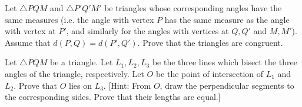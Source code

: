 \begin{tcolorbox}[title=Problem 11, breakable]
    Let $\triangle PQM$ and $\triangle P'Q'M'$ be triangles whose corresponding
        angles have the same measures (i.e. the angle with vertex $P$ has the same 
        measure as the angle with vertex at $P'$, and similarly for the angles with
        vertices at $Q, Q'$ and $M, M'$). Assume that $d(P, Q) = d(P', Q')$.
    Prove that the triangles are congruent.
\end{tcolorbox}

\begin{tcolorbox}[title=Problem 12, breakable]
    Let $\triangle PQM$ be a triangle. 
    Let $L_1, L_2, L_3$ be the three lines which bisect 
        the three angles of the triangle, respectively.
    Let $O$ be the point of intersection of $L_1$ and $L_2$.
    Prove that $O$ lies on $L_3$.
    [Hint: From $O$, draw the perpendicular segments to the corresponding sides. 
     Prove that their lengths are equal.]
\end{tcolorbox}
